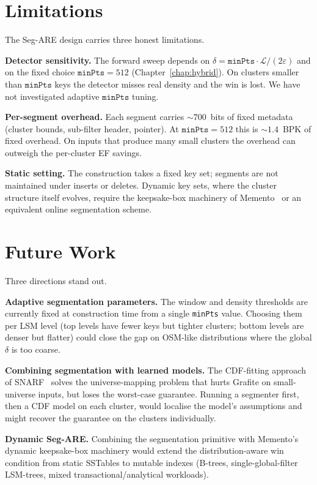 \section{Limitations}
\label{sec:conclusion-limits}

The Seg-ARE design carries three honest limitations.

\textbf{Detector sensitivity.} The forward sweep depends on
$\delta = \texttt{minPts} \cdot \mathcal{L} / (2\varepsilon)$ and on
the fixed choice $\texttt{minPts} = 512$
(Chapter~\ref{chap:hybrid}). On clusters smaller than $\texttt{minPts}$
keys the detector misses real density and the win is lost. We have
not investigated adaptive $\texttt{minPts}$ tuning.

\textbf{Per-segment overhead.} Each segment carries $\sim\!700$~bits
of fixed metadata (cluster bounds, sub-filter header, pointer). At
$\texttt{minPts} = 512$ this is $\sim\!1.4$~BPK of fixed overhead. On
inputs that produce many small clusters the overhead can outweigh the
per-cluster EF savings.

\textbf{Static setting.} The construction takes a fixed key set;
segments are not maintained under inserts or deletes. Dynamic key
sets, where the cluster structure itself evolves, require the
keepsake-box machinery of Memento~\citep{eslami2024memento} or an
equivalent online segmentation scheme.

\section{Future Work}
\label{sec:conclusion-future}

Three directions stand out.

\textbf{Adaptive segmentation parameters.} The window and density
thresholds are currently fixed at construction time from a single
\texttt{minPts} value. Choosing them per LSM level (top levels have
fewer keys but tighter clusters; bottom levels are denser but flatter)
could close the gap on OSM-like distributions where the global
$\delta$ is too coarse.

\textbf{Combining segmentation with learned models.} The CDF-fitting
approach of SNARF~\citep{vaidya2022snarf} solves the universe-mapping
problem that hurts Grafite on small-universe inputs, but loses the
worst-case guarantee. Running a segmenter first, then a CDF model on
each cluster, would localise the model's assumptions and might recover
the guarantee on the clusters individually.

\textbf{Dynamic Seg-ARE.} Combining the segmentation primitive with
Memento's dynamic keepsake-box machinery would extend the
distribution-aware win condition from static SSTables to mutable
indexes (B-trees, single-global-filter LSM-trees, mixed
transactional/analytical workloads).
